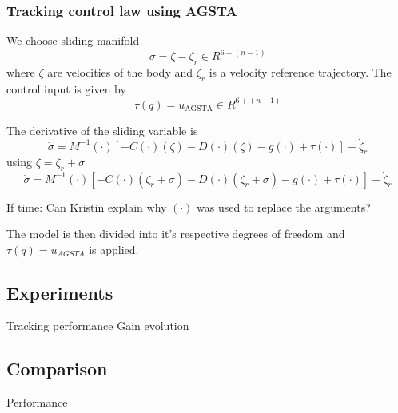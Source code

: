 \subsubsection{Tracking control law using AGSTA}
We choose sliding manifold
\begin{equation}
    \sigma = \zeta - \zeta_r \in R^{6+(n-1)}
\end{equation}
where $\zeta$ are velocities of the body and $\zeta_r$ is a velocity reference trajectory. The control input is given by
\begin{equation}
    \tau(q) = u_{\text{AGSTA}} \in R^{6+(n-1)}
\end{equation}

The derivative of the sliding variable is 
\begin{equation}
    \dot{\sigma} = M^{-1}(\cdot)\left[-C(\cdot)(\zeta)-D(\cdot)(\zeta) - g(\cdot) + \tau(\cdot)\right] - \dot{\zeta}_r
\end{equation}
using $\zeta = \zeta_r + \sigma$
\begin{equation}
    \dot{\sigma} = M^{-1}(\cdot)\left[-C(\cdot)(\zeta_r + \sigma)-D(\cdot)(\zeta_r + \sigma) - g(\cdot) + \tau(\cdot)\right] - \dot{\zeta}_r
\end{equation}
\begin{rmk}
    If time: Can Kristin explain why $(\cdot)$ was used to replace the arguments? 
\end{rmk}

The model is then divided into it's respective degrees of freedom and $\tau(q) = u_{AGSTA}$ is applied.

\subsection{Experiments}
Tracking performance \cite{Bor:22}
Gain evolution \cite{Bor:22}

\subsection{Comparison}
Performance \cite{Bor:22}


